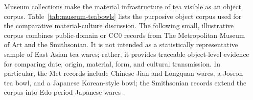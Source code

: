 \documentclass[numbers]{IntechOpen-Book}
\begin{document}
Museum collections make the material infrastructure of tea visible as an object corpus. Table~\ref{tab:museum-teabowls} lists the purposive object corpus used for the comparative material-culture discussion. The following small, illustrative corpus combines public-domain or CC0 records from The Metropolitan Museum of Art and the Smithsonian. It is not intended as a statistically representative sample of East Asian tea wares; rather, it provides traceable object-level evidence for comparing date, origin, material, form, and cultural transmission. In particular, the Met records include Chinese Jian and Longquan wares, a Joseon tea bowl, and a Japanese Korean-style bowl; the Smithsonian records extend the corpus into Edo-period Japanese wares \cite{metopenaccess,smithsonianopenaccess}.

\begin{figure}[!b]
\centering
{}
\label{fig:museum-teabowls}
\end{figure}
\end{document}
